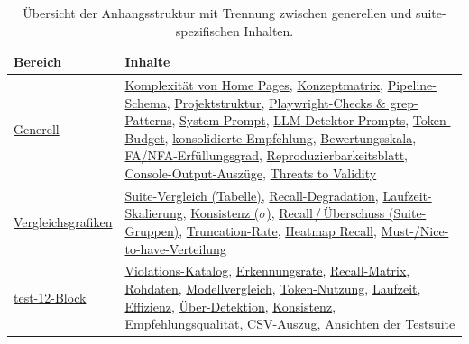 \begin{table}[htbp]
\centering
\setlength{\tabcolsep}{5pt}
\renewcommand{\arraystretch}{1.2}
\caption[Übersicht: generell vs. suite-spezifisch]{Übersicht der Anhangsstruktur mit Trennung zwischen generellen und suite-spezifischen Inhalten.}
\begin{tabular}{|p{4.3cm}|p{10.2cm}|}
\hline
\textbf{Bereich} & \textbf{Inhalte} \\
\hline
\hyperref[app:block_generell]{Generell} & \hyperref[anhang:complexity]{Komplexität von Home Pages}, \hyperref[app:konzeptmatrix]{Konzeptmatrix}, \hyperref[app:ace-pipeline-schema]{Pipeline-Schema}, \hyperref[app:projektstruktur]{Projektstruktur}, \hyperref[app:pw_grep_checks]{Playwright-Checks \& grep-Patterns}, \hyperref[app:systemprompt]{System-Prompt}, \hyperref[app:detektorprompt]{\ac{LLM}-Detektor-Prompts}, \hyperref[app:tokenbudget]{Token-Budget}, \hyperref[app:einsatzempfehlungen]{konsolidierte Empfehlung}, \hyperref[app:bewertungsskala_empfehlungen]{Bewertungsskala}, \hyperref[app:fa_nfa_erfuellung]{\ac{FA}/\ac{NFA}-Erfüllungsgrad}, \hyperref[app:reproducibility]{Reproduzierbarkeitsblatt}, \hyperref[app:console_output]{Console-Output-Auszüge}, \hyperref[app:threats_to_validity]{Threats to Validity} \\
\hline
\hyperref[app:graph_intro]{Vergleichsgrafiken} & \hyperref[app:suite_vergleich]{Suite-Vergleich (Tabelle)}, \hyperref[app:graph_recall]{Recall-Degradation}, \hyperref[app:graph_laufzeit]{Laufzeit-Skalierung}, \hyperref[app:graph_sigma]{Konsistenz ($\sigma$)}, \hyperref[app:graph_overdetektion]{Recall\,/\,Überschuss (Suite-Gruppen)}, \hyperref[app:graph_truncation]{Truncation-Rate}, \hyperref[app:graph_heatmap_demo]{Heatmap Recall}, \hyperref[app:graph_must_nice_demo]{Must-/Nice-to-have-Verteilung} \\
\hline
\hyperref[app:block_test12]{test-12-Block} & \hyperref[app:accessibility_verstoesse_12]{Violations-Katalog}, \hyperref[app:erkennungsrate_poc_12]{Erkennungsrate}, \hyperref[app:recall_matrix_12]{Recall-Matrix}, \hyperref[app:rohdaten_12]{Rohdaten}, \hyperref[app:modell_summary_12]{Modellvergleich}, \hyperref[app:token_economy_12]{Token-Nutzung}, \hyperref[app:laufzeit_effizienz]{Laufzeit}, \hyperref[app:effizienz_metriken_12]{Effizienz}, \hyperref[app:overdetection_12]{Über-Detektion}, \hyperref[app:detektor_konsistenz_12]{Konsistenz}, \hyperref[app:empfehlungsqualitaet_12]{Empfehlungsqualität}, \hyperref[app:csv_export_12]{CSV-Auszug}, \hyperref[app:screenshots_test12]{Ansichten der Testsuite} \\

\end{tabular}
\end{table}
